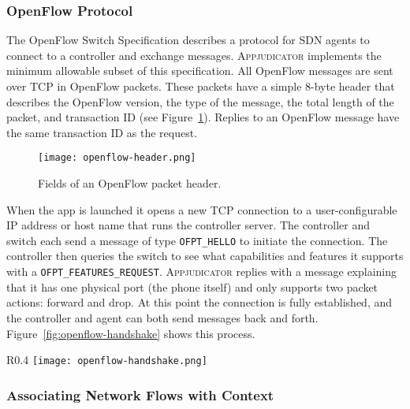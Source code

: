 \subsubsection{OpenFlow Protocol}
\label{sec:openflow-protocol}

The OpenFlow Switch Specification describes a protocol for SDN agents to connect
to a controller and exchange messages. \textsc{Appjudicator} implements the
minimum allowable subset of this specification. All OpenFlow messages are sent
over TCP in OpenFlow packets. These packets have a simple 8-byte header that
describes the OpenFlow version, the type of the message, the total length of the
packet, and transaction ID (see Figure~\ref{fig:openflow-header}). Replies to an
OpenFlow message have the same transaction ID as the request.

\begin{figure}[h]
    \centering
    \texttt{[image: openflow-header.png]}
    \caption{Fields of an OpenFlow packet header.}
    \label{fig:openflow-header}
\end{figure}

When the app is launched it opens a new TCP connection to a user-configurable IP
address or host name that runs the controller server. The controller and switch
each send a message of type \texttt{OFPT\_HELLO} to initiate the connection. The
controller then queries the switch to see what capabilities and features it
supports with a \texttt{OFPT\_FEATURES\_REQUEST}.  \textsc{Appjudicator} replies
with a message explaining that it has one physical port (the phone itself) and
only supports two packet actions: forward and drop.  At this point the
connection is fully established, and the controller and agent can both send
messages back and forth. Figure~\ref{fig:openflow-handshake} shows this process.


\begin{wrapfigure}{R}{0.4\textwidth}
	\centering
	\texttt{[image: openflow-handshake.png]}
    \caption{OpenFlow handshake diagram.}
    \label{fig:openflow-handshake}
\end{wrapfigure}


\subsubsection{Associating Network Flows with Context}
\label{sec:associating-network-flows-with-context}

